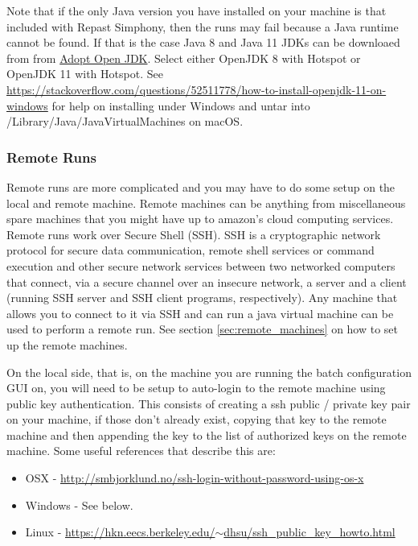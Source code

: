 \documentclass[11pt]{amsart}
\begin{document}
Note that if the only Java version you have installed on your machine is that included with
Repast Simphony, then the runs may fail because a Java runtime cannot be found. If that is
the case Java 8 and Java 11 JDKs can be downloaed from from
 \href{https://adoptopenjdk.net}{Adopt Open JDK}. Select either
OpenJDK 8 with Hotspot or OpenJDK 11 with Hotspot. See \href{https://stackoverflow.com/questions/52511778/how-to-install-openjdk-11-on-windows}
{https://stackoverflow.com/questions/52511778/how-to-install-openjdk-11-on-windows} for
help on installing under Windows and untar into /Library/Java/JavaVirtualMachines on macOS.

\subsubsection{Remote Runs}
\label{sec:distributed_runs}
Remote runs are more complicated and you may have to do some setup on the local and remote machine. Remote machines can be anything from miscellaneous spare machines that you might have up to amazon's cloud computing services. Remote runs work over Secure Shell (SSH). SSH is a cryptographic network protocol for secure data communication, remote shell services or command execution and other secure network services between two networked computers that connect, via a secure channel over an insecure network, a server and a client (running SSH server and SSH client programs, respectively). Any machine that allows you to connect to it via SSH and can run a java virtual machine can be used to perform a remote run. See section \ref{sec:remote_machines} on how to set up the remote machines.

On the local side, that is, on the machine you are running the batch configuration GUI on, you will need to be setup to auto-login to the remote machine using public key authentication. This consists of creating a ssh public / private key pair on your machine, if those don't already exist, copying that key to the remote machine and then appending the key to the list of authorized keys on the remote machine. Some useful references that describe this are:

\begin{itemize}
\item OSX - \href{http://smbjorklund.no/ssh-login-without-password-using-os-x}{http://smbjorklund.no/ssh-login-without-password-using-os-x}
\item Windows - See below.
\item Linux - \href{https://hkn.eecs.berkeley.edu/~dhsu/ssh_public_key_howto.html}{https://hkn.eecs.berkeley.edu/$\sim$dhsu/ssh\_public\_key\_howto.html}
\end{itemize}
\end{document}
